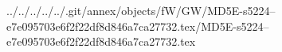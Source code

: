 ../../../../../.git/annex/objects/fW/GW/MD5E-s5224--e7e095703e6f2f22df8d846a7ca27732.tex/MD5E-s5224--e7e095703e6f2f22df8d846a7ca27732.tex